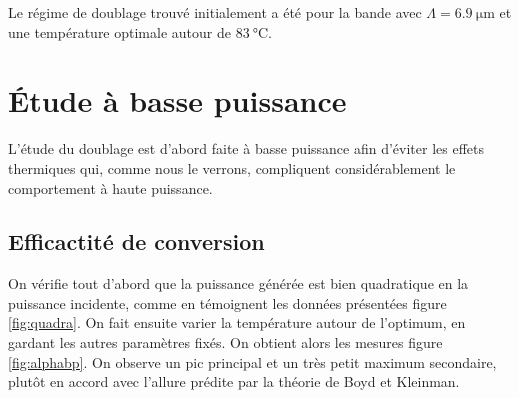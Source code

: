 \documentclass[11pt,a4paper] { article}
\begin{document}



Le régime de doublage trouvé initialement a été pour la bande avec $\Lambda = \SI{6.9}{\micro\meter}$ et une température optimale autour de $\SI{83}{\celsius}$.

\section{Étude à basse puissance}

L'étude du doublage est d'abord faite à basse puissance afin d'éviter les effets thermiques qui, comme nous le verrons, compliquent considérablement le comportement à haute puissance.

\subsection{Efficactité de conversion}

On vérifie tout d'abord que la puissance générée est bien quadratique en la puissance incidente, comme en témoignent les données présentées figure \ref{fig:quadra}. On fait ensuite varier la température autour de l'optimum, en gardant les autres paramètres fixés. On obtient alors les mesures figure \ref{fig:alphabp}. On observe un pic principal et un très petit maximum secondaire, plutôt en accord avec l'allure prédite par la théorie de Boyd et Kleinman. 
\end{document}
